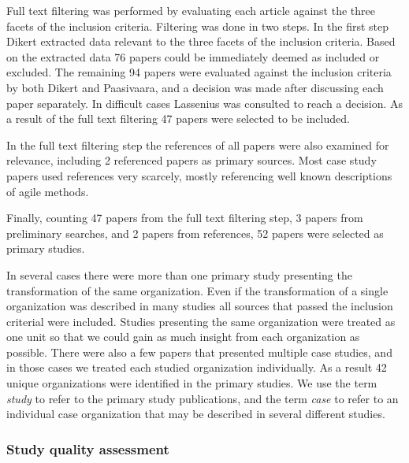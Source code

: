 \documentclass[preprint,authoryear,12pt]{elsarticle}
\begin{document}
Full text filtering was performed by evaluating each article against the three
facets of the inclusion criteria. Filtering was done in two steps. In the first
step Dikert extracted data relevant to the three facets of the inclusion
criteria. Based on the extracted data 76 papers could be immediately deemed as
included or excluded. The remaining 94 papers were evaluated against the
inclusion criteria by both Dikert and Paasivaara, and a decision was made after
discussing each paper separately. In difficult cases Lassenius was consulted to
reach a decision. As a result of the full text filtering 47 papers were selected
to be included.

In the full text filtering step the references of all papers were also examined
for relevance, including 2 referenced papers as primary sources. Most case study
papers used references very scarcely, mostly referencing well known descriptions
of agile methods.

Finally, counting 47 papers from the full text filtering step, 3 papers from
preliminary searches, and 2 papers from references, 52 papers were selected
as primary studies.

In several cases there were more than one primary study presenting the
transformation of the same organization. Even if the transformation of a single
organization was described in many studies all sources that passed the inclusion
criterial were included. Studies presenting the same organization were treated
as one unit so that we could gain as much insight from each organization as
possible. There were also a few papers that presented multiple case studies, and
in those cases we treated each studied organization individually. As a result 42
unique organizations were identified in the primary studies. We use the term
\emph{study} to refer to the primary study publications, and the term
\emph{case} to refer to an individual case organization that may be described in
several different studies.


% 


\subsubsection{Study quality assessment}
\end{document}
